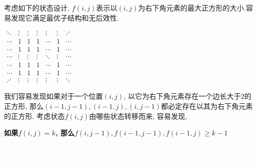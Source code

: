 考虑如下的状态设计, $f(i,j)$表示以$(i,j)$为右下角元素的最大正方形的大小.容易发现它满足最优子结构和无后效性.
\begin{center}
	\begin{math}
	\begin{matrix}
	\ddots& \vdots& \vdots& \vdots& \vdots& \vdots& \adots& \\ 
	\cdots& 1     & 1     & 1     & \cdots& 1     & \cdots& \\
	\cdots& 1     & 1     & 1     & \cdots& 1     & \cdots& \\
	\cdots& \vdots& \vdots& \vdots& \ddots& \vdots& \cdots& \\
	\cdots& 1     & 1     & 1     & \cdots& 1     & \cdots& \\
	\cdots& 1     & 1     & 1     &　\cdots& 1     & \cdots& \\ 
	\adots& \vdots& \vdots& \vdots& \vdots& \vdots& \ddots& 
	\end{matrix}
	\end{math}
\end{center}
\par 我们容易发现如果对于一个位置$(i,j)$, 以它为右下角元素存在一个边长大于$2$的正方形, 那么$(i-1,j-1),(i-1,j),(i,j-1)$都必定存在以其为右下角元素的正方形.
考虑状态$f(i,j)$由哪些状态转移而来, 容易发现, \begin{center}\textbf{如果$f(i,j)=k$, 那么$f(i,j-1),f(i-1,j-1),f(i-1,j)\geq k-1$}\end{center}













\textcolor{white}{希望大家不要放弃，OIer这个群体很是特殊，并且饱受排挤，大家一定坚持下去，不管外界怎么看待我们，一定要记住自己的目标。不忘初心，方得始终。}
